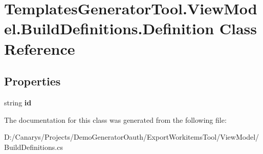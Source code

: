 \hypertarget{class_templates_generator_tool_1_1_view_model_1_1_build_definitions_1_1_definition}{}\section{Templates\+Generator\+Tool.\+View\+Model.\+Build\+Definitions.\+Definition Class Reference}
\label{class_templates_generator_tool_1_1_view_model_1_1_build_definitions_1_1_definition}
\subsection*{Properties}
\begin{DoxyCompactItemize}
\item 
\mbox{\label{class_templates_generator_tool_1_1_view_model_1_1_build_definitions_1_1_definition_ab657b4daaa5d97eb1e701500fbf36f6a}} 
string {\bfseries id}
\end{DoxyCompactItemize}


The documentation for this class was generated from the following file\+:\begin{DoxyCompactItemize}
\item 
D\+:/\+Canarys/\+Projects/\+Demo\+Generator\+Oauth/\+Export\+Workitems\+Tool/\+View\+Model/Build\+Definitions.\+cs\end{DoxyCompactItemize}
